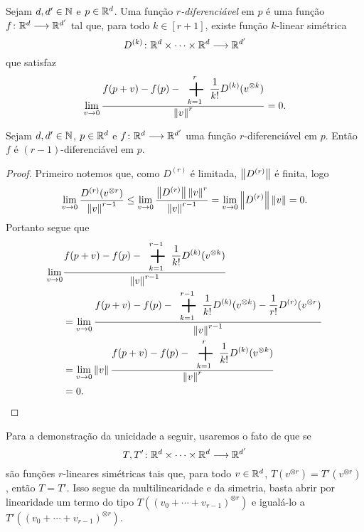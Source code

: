 \begin{definition}
Sejam $d,d' \in \mathbb{N}$ e $p \in \mathbb{R}^d$. Uma função \emph{$r$-diferenciável} em $p$ é uma função ${f}\colon {\mathbb{R}^d} \longrightarrow {\mathbb{R}^{d'}}$ tal que, para todo $k \in [r+1]$, existe função $k$-linear simétrica
	\begin{equation*}
	{D^{(k)}}\colon {\mathbb{R}^d \times \cdots \times \mathbb{R}^d} \longrightarrow {\mathbb{R}^{d'}}
	\end{equation*}
que satisfaz
	\begin{equation*}
	\lim_{v \conv 0} \frac{\displaystyle f(p+v)-f(p)- \sum_{k=1}^r \frac{1}{k!} D^{(k)}(v^{\otimes k})}{\nor{v}^r} = 0.
	\end{equation*}
\end{definition}

\begin{proposition}
Sejam $d,d' \in \mathbb{N}$, $p \in \mathbb{R}^d$ e ${f}\colon {\mathbb{R}^d} \longrightarrow {\mathbb{R}^{d'}}$ uma função $r$-diferenciável em $p$. Então $f$ é $(r-1)$-diferenciável em $p$.
\end{proposition}
\begin{proof}
Primeiro notemos que, como $D^{(r)}$ é limitada, $\left\Vert{D^{(r)}}\right\Vert$ é finita, logo
	\begin{equation*}
	\lim_{v \rightarrow 0} \frac{D^{(r)}(v^{\otimes r})}{\left\Vert{v}\right\Vert^{r-1}} \leq \lim_{v \rightarrow 0} \frac{\left\Vert{D^{(r)}}\right\Vert \left\Vert{v}\right\Vert^r}{\left\Vert{v}\right\Vert^{r-1}} = \lim_{v \rightarrow 0} \left\Vert{D^{(r)}}\right\Vert\left\Vert{v}\right\Vert = 0.
	\end{equation*}
Portanto segue que
	\begin{align*}
	\lim_{v \conv 0} &\frac{\displaystyle f(p+v)-f(p)- \sum_{k=1}^{r-1} \frac{1}{k!}D^{(k)}(v^{\otimes k})}{\nor{v}^{r-1}} \\
		&= \lim_{v \conv 0} \frac{\displaystyle f(p+v)-f(p)- \sum_{k=1}^{r-1} \frac{1}{k!}D^{(k)}(v^{\otimes k})-\frac{1}{r!}D^{(r)}(v^{\otimes r})}{\nor{v}^{r-1}}\\
		&= \lim_{v \conv 0} \nor{v}\frac{\displaystyle f(p+v)-f(p)- \sum_{k=1}^r \frac{1}{k!}D^{(k)}(v^{\otimes k})}{\nor{v}^r} \\
		&= 0.
		\qedhere
	\end{align*}
\end{proof}

Para a demonstração da unicidade a seguir, usaremos o fato de que se
	\begin{equation*}
	{T,T'}\colon {\mathbb{R}^d \times \cdots \times \mathbb{R}^d} \longrightarrow {\mathbb{R}^{d'}}
	\end{equation*}
são funções $r$-lineares simétricas tais que, para todo $v \in \mathbb{R}^d$, $T(v^{\otimes r}) = T'(v^{\otimes r})$, então $T=T'$. Isso segue da multilinearidade e da simetria, basta abrir por linearidade um termo do tipo $T((v_0+\cdots+v_{r-1})^{\otimes r})$ e igualá-lo a $T'((v_0+\cdots+v_{r-1})^{\otimes r})$.

